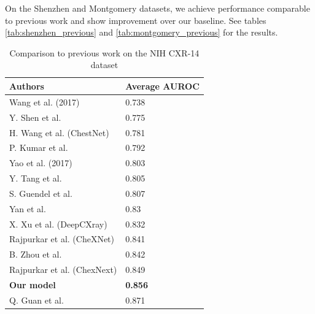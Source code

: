 \documentclass[12pt,oneside,a4paper]{report}
\begin{document}
On the Shenzhen and Montgomery datasets, we achieve performance comparable to
previous work and show improvement over our baseline. See tables
\ref{tab:shenzhen_previous} and \ref{tab:montgomery_previous} for the results.

\begin{table}[]
  \centering
  \begin{tabular}{ll}
    \hline
    \textbf{Authors}            & \textbf{Average AUROC} \\ \hline
    Wang et al. (2017)          & 0.738                  \\ \hline
    Y. Shen et al.              & 0.775                  \\ \hline
    H. Wang et al. (ChestNet)   & 0.781                  \\ \hline
    P. Kumar et al.             & 0.792                  \\ \hline
    Yao et al. (2017)           & 0.803                  \\ \hline
    Y. Tang et al.              & 0.805                  \\ \hline
    S. Guendel et al.           & 0.807                  \\ \hline
    Yan et al.                  & 0.83                   \\ \hline
    X. Xu et al. (DeepCXray)    & 0.832                  \\ \hline
    Rajpurkar et al. (CheXNet)  & 0.841                  \\ \hline
    B. Zhou et al.              & 0.842                  \\ \hline
    Rajpurkar et al. (ChexNext) & 0.849                  \\ \hline
    \textbf{Our model}          & \textbf{0.856}         \\ \hline
    Q. Guan et al.              & 0.871                  \\ \hline
  \end{tabular}
  \caption{Comparison to previous work on the NIH CXR-14 dataset}
  \label{tab:nih_previous}
\end{table}
\end{document}
